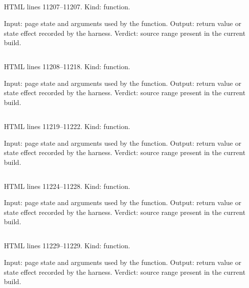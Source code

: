 \subsection*{\texttt{}}
\label{vf_612_selItem}
HTML lines 11207--11207. Kind: function.

Input: page state and arguments used by the function.
Output: return value or state effect recorded by the harness.
Verdict: source range present in the current build.

\subsection*{\texttt{}}
\label{vf_613_selMatch}
HTML lines 11208--11218. Kind: function.

Input: page state and arguments used by the function.
Output: return value or state effect recorded by the harness.
Verdict: source range present in the current build.

\subsection*{\texttt{}}
\label{vf_614_selSelected}
HTML lines 11219--11222. Kind: function.

Input: page state and arguments used by the function.
Output: return value or state effect recorded by the harness.
Verdict: source range present in the current build.

\subsection*{\texttt{}}
\label{vf_615_selMatchAll}
HTML lines 11224--11228. Kind: function.

Input: page state and arguments used by the function.
Output: return value or state effect recorded by the harness.
Verdict: source range present in the current build.

\subsection*{\texttt{}}
\label{vf_616_selAdd}
HTML lines 11229--11229. Kind: function.

Input: page state and arguments used by the function.
Output: return value or state effect recorded by the harness.
Verdict: source range present in the current build.

